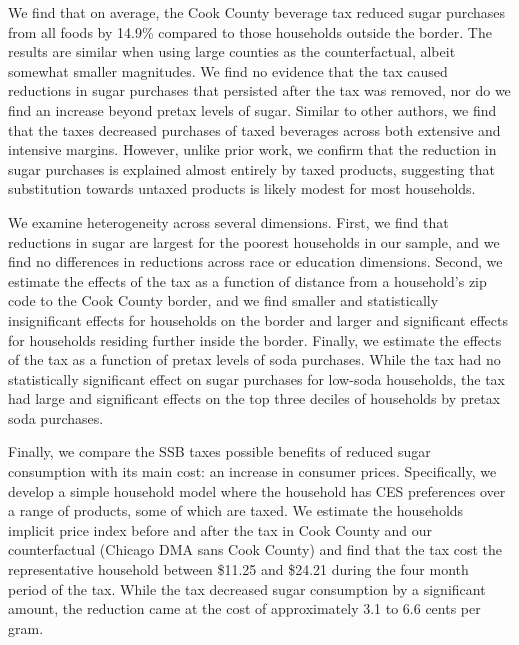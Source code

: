 \documentclass[12pt]{article}
\begin{document}
We find that on average, the Cook County beverage tax reduced sugar purchases from all foods by 14.9\% compared to those households outside the border. The results are similar when using large counties as the counterfactual, albeit somewhat smaller magnitudes. We find no evidence that the tax caused reductions in sugar purchases that persisted after the tax was removed, nor do we find an increase beyond pretax levels of sugar. Similar to other authors, we find that the taxes decreased purchases of taxed beverages across both extensive and intensive margins. However, unlike prior work, we confirm that the reduction in sugar purchases is explained almost entirely by taxed products, suggesting that substitution towards untaxed products is likely modest for most households.

We examine heterogeneity across several dimensions. First, we find that reductions in sugar are largest for the poorest households in our sample, and we find no differences in reductions across race or education dimensions. Second, we estimate the effects of the tax as a function of distance from a household's zip code to the Cook County border, and we find smaller and statistically insignificant effects for households on the border and larger and significant effects for households residing further inside the border. Finally, we estimate the effects of the tax as a function of pretax levels of soda purchases. While the tax had no statistically significant effect on sugar purchases for low-soda households, the tax had large and significant effects on the top three deciles of households by pretax soda purchases.

Finally, we compare the SSB taxes possible benefits of reduced sugar consumption with its main cost: an increase in consumer prices. Specifically, we develop a simple household model where the household has CES preferences over a range of products, some of which are taxed. We estimate the households implicit price index before and after the tax in Cook County and our counterfactual (Chicago DMA sans Cook County) and find that the tax cost the representative household between \$11.25 and \$24.21 during the four month period of the tax. While the tax decreased sugar consumption by a significant amount, the reduction came at the cost of approximately 3.1 to 6.6 cents per gram.
\end{document}
